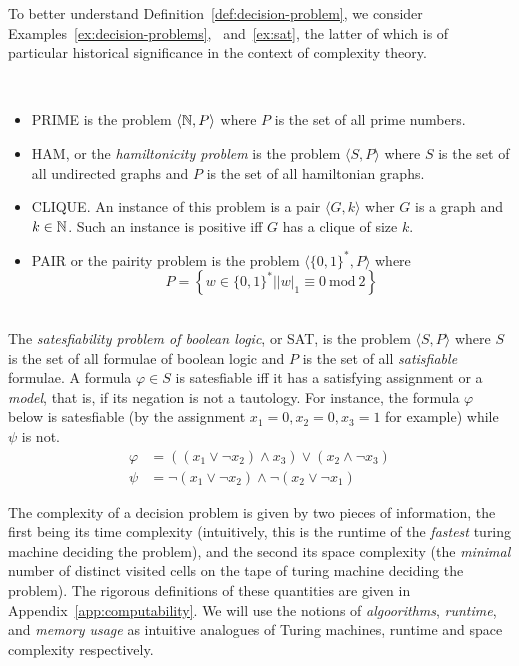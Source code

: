 To better understand Definition~\ref{def:decision-problem}, we consider Examples~\ref{ex:decision-problems},
~and~\ref{ex:sat}, the latter of which is of particular historical significance in the context of complexity theory.
\begin{example}\ \\
    \label{ex:decision-problems}
    \begin{itemize}
        \item \textsf{PRIME} is the problem \(\langle \mathbb{N}, P\rangle\) where \(P\) is the set of all prime numbers. 
        \item \textsf{HAM}, or the \emph{hamiltonicity problem} is the problem \(\langle S, P \rangle\) where \(S\) is the set of all undirected graphs and \(P\) is the set of all hamiltonian graphs.
        \item \textsf{CLIQUE}. An instance of this problem is a pair \(\langle G, k\rangle\) wher \(G\) is a graph and \(k\in\mathbb{N}\). Such an instance is positive iff \(G\) has a clique of size \(k\). 
        \item \textsf{PAIR} or the pairity problem is the problem \(\langle \{0, 1\}^\ast, P \rangle\) where 
        \[P = \left\{w\in \{0, 1\}^\ast\big| |w|_1 \equiv 0 \mathrm{\ mod\ } 2 \right\}\]
    \end{itemize}
\end{example}

\begin{example}\ \\
    \label{ex:sat}
    The \emph{satesfiability problem of boolean logic}, or \textsf{SAT}, is the problem \(\langle S, P\rangle\) where \(S\) is the set of all formulae of boolean logic and \(P\) is the set of all \emph{satisfiable} formulae. A formula \(\varphi \in S\) is satesfiable iff it has a satisfying assignment or a \emph{model}, that is, if its negation is not a tautology. For instance, the formula \(\varphi\) below is satesfiable (by the assignment \(x_1 = 0, x_2 = 0, x_3 = 1\) for example) while \(\psi\) is not.
    \begin{align*}
        \varphi& = \left((x_1 \vee \neg x_2) \wedge x_3\right) \vee (x_2 \wedge \neg x_3)\\
        \psi &= \neg (x_1 \vee \neg x_2) \wedge \neg (x_2 \vee \neg x_1)
    \end{align*}
\end{example}

The complexity of a decision problem is given by two pieces of information, the first being its time complexity (intuitively, this is the runtime of the \emph{fastest} turing machine deciding the problem), and the second its space complexity (the \emph{minimal} number of distinct visited cells on the tape of turing machine deciding the problem). The rigorous definitions of these quantities are given in Appendix~\ref{app:computability}. We will use the notions of \emph{algoorithms}, \emph{runtime}, and \emph{memory usage} as intuitive analogues of Turing machines, runtime and space complexity respectively.

